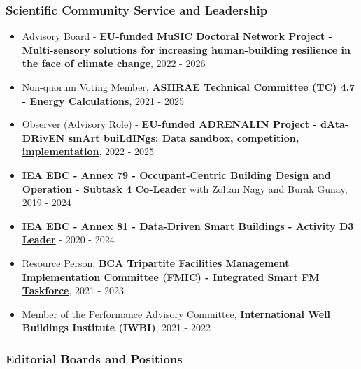 \documentclass[10pt,a4paper]{article}
\begin{document}
\begin{small}
\subsubsection*{Scientific Community Service and Leadership}

\begin{itemize}
\item
Advisory Board - \href{https://www.linkedin.com/company/music-doctoral-network/}{\textbf{EU-funded MuSIC Doctoral Network Project - Multi-sensory solutions for increasing human-building resilience in the face of climate change}}, 2022 - 2026
\item
Non-quorum Voting Member, \textbf{\href{https://tpc.ashrae.org/?cmtKey=bba8e395-cc3c-4f2e-ace5-7f658af05f85}{ASHRAE Technical Committee (TC) 4.7 - Energy Calculations}}, 2021 - 2025
\item
Observer (Advisory Role) - \href{https://adrenalin.energy/}{\textbf{EU-funded ADRENALIN Project - dAta-DRivEN smArt buiLdINgs: Data sandbox, competition, implementation}}, 2022 - 2025
\item
\textbf{\href{http://annex79.iea-ebc.org/}{IEA EBC - Annex 79 - Occupant-Centric Building Design and Operation - Subtask 4 Co-Leader}} with Zoltan Nagy and Burak Gunay, 2019 - 2024
\item
\textbf{\href{https://annex81.iea-ebc.org/}{IEA EBC - Annex 81 - Data-Driven Smart Buildings - Activity D3 Leader}} - 2020 - 2024
\item
Resource Person, \textbf{\href{https://www.bca.gov.sg/greenmark/facilities-management-industry-transformation-fmic.html}{BCA Tripartite Facilities Management Implementation Committee (FMIC) - Integrated Smart FM Taskforce}}, 2021 - 2023
\item
\href{https://resources.wellcertified.com/articles/introducing-the-2021-iwbi-advisors/}{Member of the Performance Advisory Committee}, \textbf{International Well Buildings Institute (IWBI)}, 2021 - 2022

\end{itemize}

\subsubsection*{Editorial Boards and Positions}
\begin{itemize}


\end{itemize}
\end{small}
\end{document}
